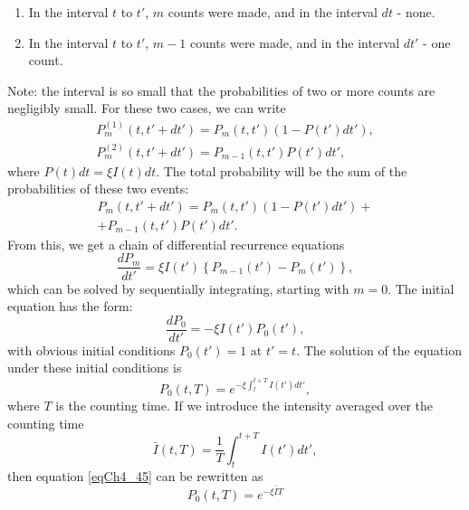 \begin{enumerate}
\item In the interval $t$ to $t'$, $m$ counts were made, and in the interval $dt$ - none.
\item In the interval $t$ to $t'$, $m - 1$ counts were made, and in the interval $dt'$ - one count.
\end{enumerate}
Note: the interval is so small that the probabilities of two or more counts are negligibly small. For these two cases, we can write
\begin{eqnarray}
P_m^{(1)}\left(t, t' + dt'\right) = 
P_m\left(t, t'\right)\left(1 - P\left(t'\right)dt'\right),
\nonumber \\
P_m^{(2)}\left(t, t' + dt'\right) = 
P_{m - 1}\left(t, t'\right)P\left(t'\right)dt',
\label{eqCh4_41}
\end{eqnarray}
where $P\left(t\right)dt = \xi I\left(t\right)dt$.  
The total probability will be the sum of the probabilities of these two events:
\begin{eqnarray}
P_m\left(t, t' + dt'\right) = 
P_m\left(t, t'\right)\left(1 - P\left(t'\right)dt'\right) +
\nonumber \\
+
P_{m - 1}\left(t, t'\right)P\left(t'\right)dt'.
\label{eqCh4_42}
\end{eqnarray}
From this, we get a chain of differential recurrence equations
\begin{equation}
\frac{dP_m}{dt'} = \xi I\left(t'\right)\left\{P_{m - 1}\left(t'\right)
- P_m\left(t'\right)\right\},
\label{eqCh4_43}
\end{equation}
which can be solved by sequentially integrating, starting with $m = 0$. The initial equation has the form:
\begin{equation}
\frac{dP_0}{dt'} = - \xi I\left(t'\right) P_0\left(t'\right),
\label{eqCh4_44}
\end{equation}
with obvious initial conditions $P_0\left(t'\right) = 1$ at $t' = t$. The solution of the equation under these initial conditions is
\begin{equation}
P_0\left(t, T\right) = e^{- \xi \int_t^{t + T} I\left(t'\right) d t'}, 
\label{eqCh4_45}
\end{equation}
where $T$ is the counting time. If we introduce the intensity averaged over the counting time
\[
\bar{I}\left(t, T\right) = \frac{1}{T}
\int_t^{t + T}I\left(t'\right)dt',
\]
then equation \eqref{eqCh4_45} can be rewritten as
\begin{equation}
P_0\left(t, T\right) = e^{- \xi \bar{I} T}
\label{eqCh4_46}
\end{equation}
